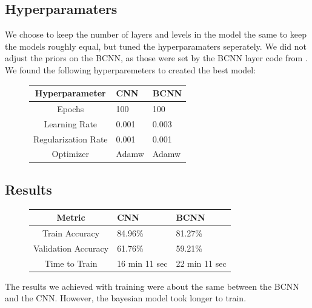 \documentclass[12pt]{article}
\begin{document}
\subsection{Hyperparamaters}

We choose to keep the number of layers and levels in the model the same to keep the models roughly equal, but tuned the hyperparamaters seperately. We did not adjust the priors on the BCNN, as those were set by the BCNN layer code from \cite{shridhar2018uncertainty}. We found the following hyperparemeters to created the best model:

\begin{figure}[H]
	\begin{center}
	\begin{tabular}{|c||p{3cm}|p{3cm}|} %
	\hline
	\textbf{Hyperparameter} & \textbf{CNN} & \textbf{BCNN} \\ [0.5ex] 
	\hline\hline
	Epochs & 100 & 100\\
	\hline
	Learning Rate & 0.001  & 0.003  \\
	\hline
	Regularization Rate& 0.001 & 0.001 \\
	\hline
	Optimizer & Adamw  & Adamw  \\
	\hline
\end{tabular}
\end{center}
\end{figure}



\subsection{Results}



\begin{figure}[H]
	\begin{tabular}{|c||p{3cm}|p{3cm}|} %
		\hline
		\textbf{Metric} & \textbf{CNN} & \textbf{BCNN} \\ [0.5ex] 
		\hline\hline
		Train Accuracy & 84.96\% & 81.27\%\\
		\hline
		Validation Accuracy & 61.76\%  & 59.21\%  \\
		\hline
		Time to Train & 16 min 11 sec  & 22 min 11 sec  \\
		\hline
	\end{tabular}
\end{figure}

The results we achieved with training were about the same between the BCNN and the CNN. However, the bayesian model took longer to train.
\end{document}
